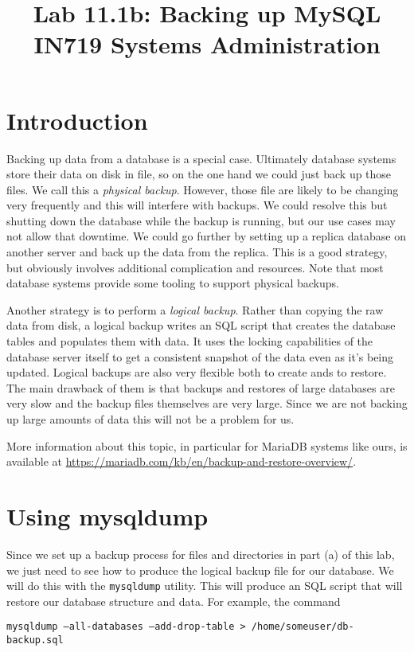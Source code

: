 \documentclass{article}   	%
\title{Lab 11.1b:  Backing up MySQL\\ IN719 Systems Administration}
\date{}							%
\begin{document}
\maketitle

\section*{Introduction}
Backing up data from a database is a special case.  Ultimately database systems store their data on disk in file, so on the one hand we could just back up those files. We call this a \emph{physical backup}. However, those file are likely to be changing very frequently and this will interfere with backups. We could resolve this but shutting down the database while the backup is running, but our use cases may not allow that downtime. We could go further by setting up a replica database on another server and back up the data from the replica. This is a good strategy, but obviously involves additional complication and resources. Note that most database systems provide some tooling to support physical backups.

Another strategy is to perform a \emph{logical backup}. Rather than copying the raw data from disk, a logical backup writes an SQL script that creates the database tables and populates them with data. It uses the locking capabilities of the database server itself to get a consistent snapshot of the data even as it's being updated. Logical backups are also very flexible both to create ands to restore. The main drawback of them is that backups and restores of large databases are very slow and the backup files themselves are very large. Since we are not backing up large amounts of data this will not be a problem for us.

More information about this topic, in particular for MariaDB systems like ours, is available at \url{https://mariadb.com/kb/en/backup-and-restore-overview/}.


\section{Using mysqldump}
Since we set up a backup process for files and directories in part (a) of this lab, we just need to see how to produce the logical backup file for our database. We will do this with the \texttt{mysqldump} utility. This will produce an SQL script that will restore our database structure and data.  For example, the command

\texttt {mysqldump --all-databases --add-drop-table > /home/someuser/db-backup.sql}
\end{document}
